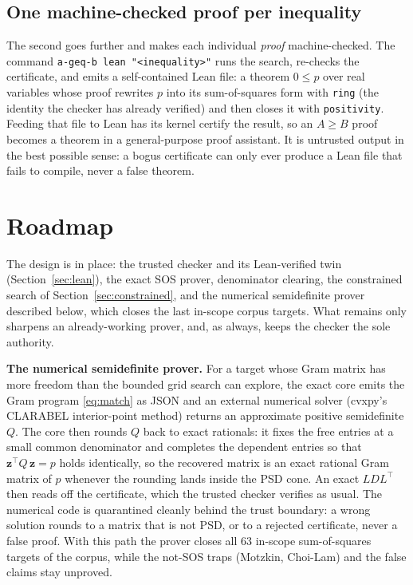 \documentclass[11pt]{article}
\theoremstyle{definition}
\theoremstyle{plain}
\newcommand{\z}{\mathbf{z}}
\newcommand{\transpose}{^{\!\top}}
\begin{document}
\subsection{One machine-checked proof per inequality}

The second goes further and makes each individual \emph{proof} machine-checked.
The command \texttt{a-geq-b lean "<inequality>"} runs the search, re-checks the
certificate, and emits a self-contained Lean file: a theorem $0 \le p$ over real
variables whose proof rewrites $p$ into its sum-of-squares form with
\texttt{ring} (the identity the checker has already verified) and then closes
it with \texttt{positivity}. Feeding that file to Lean has its kernel certify the
result, so an $A \ge B$ proof becomes a theorem in a general-purpose proof
assistant. It is untrusted output in the best possible sense: a bogus certificate
can only ever produce a Lean file that fails to compile, never a false theorem.

\section{Roadmap}
\label{sec:roadmap}

The design is in place: the trusted checker and its Lean-verified twin
(Section~\ref{sec:lean}), the exact SOS prover, denominator clearing, the
constrained search of Section~\ref{sec:constrained}, and the numerical
semidefinite prover described below, which closes the last in-scope corpus
targets. What remains only sharpens an already-working prover, and, as always,
keeps the checker the sole authority.

\smallskip
\noindent\textbf{The numerical semidefinite prover.} For a target whose Gram
matrix has more freedom than the bounded grid search can explore, the exact core
emits the Gram program \eqref{eq:match} as JSON and an external numerical solver
(cvxpy's CLARABEL interior-point method) returns an approximate positive
semidefinite $Q$. The core then rounds $Q$ back to exact rationals: it fixes the
free entries at a small common denominator and completes the dependent entries so
that $\z\transpose Q\, \z = p$ holds identically, so the recovered matrix is an
exact rational Gram matrix of $p$ whenever the rounding lands inside the PSD cone.
An exact $LDL^{\top}$ then reads off the certificate, which the trusted checker
verifies as usual. The numerical code is quarantined cleanly behind the trust
boundary: a wrong solution rounds to a matrix that is not PSD, or to a rejected
certificate, never a false proof. With this path the prover closes all $63$
in-scope sum-of-squares targets of the corpus, while the not-SOS traps (Motzkin,
Choi-Lam) and the false claims stay unproved.
\end{document}
